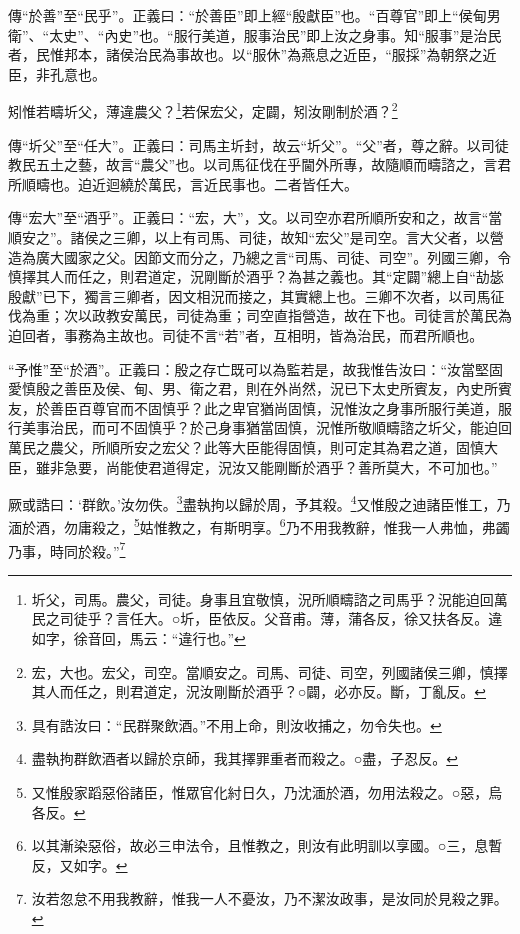 {\noindent\zhuan{}\fzbyks 傳“於善”至“民乎”。正義曰：“於善臣”即上經“殷獻臣”也。“百尊官”即上“侯甸男衛”、“太史”、“內史”也。“服行美道，服事治民”即上汝之身事。知“服事”是治民者，民惟邦本，諸侯治民為事故也。以“服休”為燕息之近臣，“服採”為朝祭之近臣，非孔意也。 \par}

矧惟若疇圻父，薄違農父？\footnote{圻父，司馬。農父，司徒。身事且宜敬慎，況所順疇諮之司馬乎？況能迫回萬民之司徒乎？言任大。○圻，臣依反。父音甫。薄，蒲各反，徐又扶各反。違如字，徐音回，馬云：“違行也。”}若保宏父，定闢，矧汝剛制於酒？\footnote{宏，大也。宏父，司空。當順安之。司馬、司徒、司空，列國諸侯三卿，慎擇其人而任之，則君道定，況汝剛斷於酒乎？○闢，必亦反。斷，丁亂反。}

{\noindent\zhuan{}\fzbyks 傳“圻父”至“任大”。正義曰：司馬主圻封，故云“圻父”。“父”者，尊之辭。以司徒教民五土之藝，故言“農父”也。以司馬征伐在乎閫外所專，故隨順而疇諮之，言君所順疇也。迫近迴繞於萬民，言近民事也。二者皆任大。 \par}

{\noindent\zhuan{}\fzbyks 傳“宏大”至“酒乎”。正義曰：“宏，大”，文。以司空亦君所順所安和之，故言“當順安之”。諸侯之三卿，以上有司馬、司徒，故知“宏父”是司空。言大父者，以營造為廣大國家之父。因節文而分之，乃總之言“司馬、司徒、司空”。列國三卿，令慎擇其人而任之，則君道定，況剛斷於酒乎？為甚之義也。其“定闢”總上自“劼毖殷獻”已下，獨言三卿者，因文相況而接之，其實總上也。三卿不次者，以司馬征伐為重；次以政教安萬民，司徒為重；司空直指營造，故在下也。司徒言於萬民為迫回者，事務為主故也。司徒不言“若”者，互相明，皆為治民，而君所順也。 \par}

{\noindent\shu{}\fzkt “予惟”至“於酒”。正義曰：殷之存亡既可以為監若是，故我惟告汝曰：“汝當堅固愛慎殷之善臣及侯、甸、男、衛之君，則在外尚然，況已下太史所賓友，內史所賓友，於善臣百尊官而不固慎乎？此之卑官猶尚固慎，況惟汝之身事所服行美道，服行美事治民，而可不固慎乎？於己身事猶當固慎，況惟所敬順疇諮之圻父，能迫回萬民之農父，所順所安之宏父？此等大臣能得固慎，則可定其為君之道，固慎大臣，雖非急要，尚能使君道得定，況汝又能剛斷於酒乎？善所莫大，不可加也。” \par}

厥或誥曰：‘群飲。’汝勿佚。\footnote{具有誥汝曰：“民群聚飲酒。”不用上命，則汝收捕之，勿令失也。}盡執拘以歸於周，予其殺。\footnote{盡執拘群飲酒者以歸於京師，我其擇罪重者而殺之。○盡，子忍反。}又惟殷之迪諸臣惟工，乃湎於酒，勿庸殺之，\footnote{又惟殷家蹈惡俗諸臣，惟眾官化紂日久，乃沈湎於酒，勿用法殺之。○惡，烏各反。}姑惟教之，有斯明享。\footnote{以其漸染惡俗，故必三申法令，且惟教之，則汝有此明訓以享國。○三，息暫反，又如字。}乃不用我教辭，惟我一人弗恤，弗蠲乃事，時同於殺。”\footnote{汝若忽怠不用我教辭，惟我一人不憂汝，乃不潔汝政事，是汝同於見殺之罪。}


